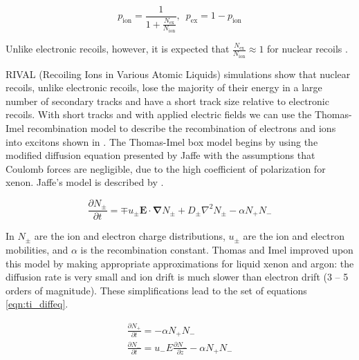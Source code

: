 \begin{equation}
        p_{\textrm{ion}} = \frac{1}{1 + \frac{N_{\textrm{ex}}}{N_{\textrm{ion}}}}, \, \, \, p_{\textrm{ex}} = 1 - p_{\textrm{ion}}
\end{equation}

Unlike electronic recoils, however, it is expected that $\frac{N_{\textrm{ex}}}{N_{\textrm{ion}}} \approx 1$ for nuclear recoils \cite{angle2011search, sorensen2011nuclear, lenardo2015global}.

RIVAL (Recoiling Ions in Various Atomic Liquids) simulations show that nuclear recoils, unlike electronic recoils, lose the majority of their energy in a large number of secondary tracks and have a short track size relative to electronic recoils.  With short tracks and with applied electric fields we can use the Thomas-Imel recombination model to describe the recombination of electrons and ions into excitons shown in  \cite{dahl_thesis}.   The Thomas-Imel box model \cite{thomas1987recombination} begins by using the modified diffusion equation presented by Jaffe \cite{jaffe1913theory} with the assumptions that Coulomb forces are negligible, due to the high coefficient of polarization for xenon.  Jaffe's model is described by .

\begin{equation}
        \label{eqn:jaffe_recomb}
        \frac{\partial N_{\pm}}{\partial t} = \mp u_{\pm} \bm{E} \cdot \bm{\nabla} N_{\pm} + D_{\pm} \nabla^2 N_{\pm} - \alpha N_+ N_-
\end{equation}

In  $N_{\pm}$ are the ion and electron charge distributions, $u_{\pm}$ are the ion and electron mobilities, and $\alpha$ is the recombination constant.  Thomas and Imel improved upon this model by making appropriate approximations for liquid xenon and argon: the diffusion rate is very small and ion drift is much slower than electron drift (3 -- 5 orders of magnitude).  These simplifications lead to the set of equations \ref{eqn:ti_diffeq}.

\begin{equation}
        \label{eqn:ti_diffeq}
        \begin{gathered}
                \frac{\partial N_+}{\partial t} = - \alpha N_+ N_- \\
                \frac{\partial N_-}{\partial t} = u_- E \frac{\partial N_-}{\partial z} - \alpha N_+ N_-
        \end{gathered}
\end{equation}

